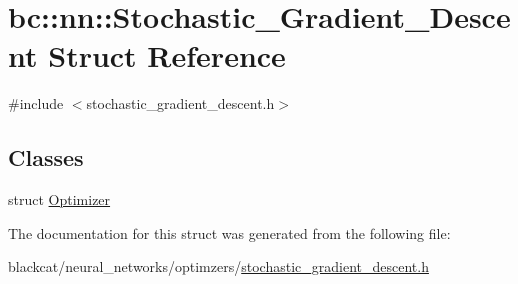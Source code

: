 \hypertarget{structbc_1_1nn_1_1Stochastic__Gradient__Descent}{}\section{bc\+:\+:nn\+:\+:Stochastic\+\_\+\+Gradient\+\_\+\+Descent Struct Reference}
\label{structbc_1_1nn_1_1Stochastic__Gradient__Descent}


{\ttfamily \#include $<$stochastic\+\_\+gradient\+\_\+descent.\+h$>$}

\subsection*{Classes}
\begin{DoxyCompactItemize}
\item 
struct \hyperlink{structbc_1_1nn_1_1Stochastic__Gradient__Descent_1_1Optimizer}{Optimizer}
\end{DoxyCompactItemize}


The documentation for this struct was generated from the following file\+:\begin{DoxyCompactItemize}
\item 
blackcat/neural\+\_\+networks/optimzers/\hyperlink{stochastic__gradient__descent_8h}{stochastic\+\_\+gradient\+\_\+descent.\+h}\end{DoxyCompactItemize}
